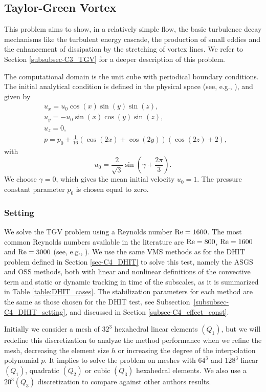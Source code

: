\subsection{Taylor-Green Vortex}
\label{subsec-C4_TGV}
This problem aims to show, in a relatively simple flow, the basic turbulence decay mechanisms like the turbulent energy cascade, the production of small eddies and the enhancement of dissipation by the stretching of vortex lines. We refer to Section \ref{subsubsec-C3_TGV} for a deeper description of this problem.

The computational domain is the unit cube with periodical boundary conditions. The initial analytical condition is defined in the physical space (see, e.g., \cite{gassner_accuracy_????}), and given by
\begin{align}
\label{eq-C4_ini_sol_TG}
&u_x=u_0\cos(x)\sin(y)\sin(z),\\\nonumber
&u_y=-u_0\sin(x)\cos(y)\sin(z),\\\nonumber
&u_z=0,\\\nonumber
&p=p_0+\frac{1}{16}\left(\cos(2x)+\cos(2y)\right)\left(\cos(2z)+2\right),
\end{align}
with
$$u_0=\frac{2}{\sqrt{3}}\sin\left(\gamma+\frac{2\pi}{3}\right).$$
We choose $\gamma=0$, which gives the mean initial velocity  $u_0=1$. The pressure constant parameter $p_0$ is chosen equal to zero.

\subsubsection{Setting}

We solve the TGV problem using a Reynolds number ${\rm Re}=1600$. 
The most common Reynolds numbers available in the literature are ${\rm Re}=800$, ${\rm Re}=1600$ and ${\rm Re}=3000$ (see, e.g., \cite{andrea_d._beck_numerical_2012, fauconnier_construction_2009, gassner_accuracy_????, jb_chapelier_final_2012}).
We use the same VMS methods as for the DHIT problem defined in Section \ref{sec-C4_DHIT} to solve this test, namely the ASGS and OSS methods, both with linear and nonlinear definitions of the convective term and static or dynamic tracking in time of the subscales, as it is summarized in Table \ref{table:DHIT_cases}.
The stabilization parameters for each method are the same as those chosen for the DHIT test, see Subsection~\ref{subsubsec-C4_DHIT_setting}, and discussed in Section \ref{subsec-C4_effect_const}.

Initially we consider a mesh of $32^3$ hexahedral linear elements $(Q_1)$, but we will redefine this discretization to analyze the method performance when we refine the mesh, decreasing the element size $h$ or increasing the degree of the interpolation polynomial $p$. It implies to solve the problem on meshes with $64^3$ and $128^3$ linear $(Q_1)$, quadratic $(Q_2)$ or cubic $(Q_3)$ hexahedral elements. We also use a $20^3(Q_3)$ discretization to compare against other authors results.

